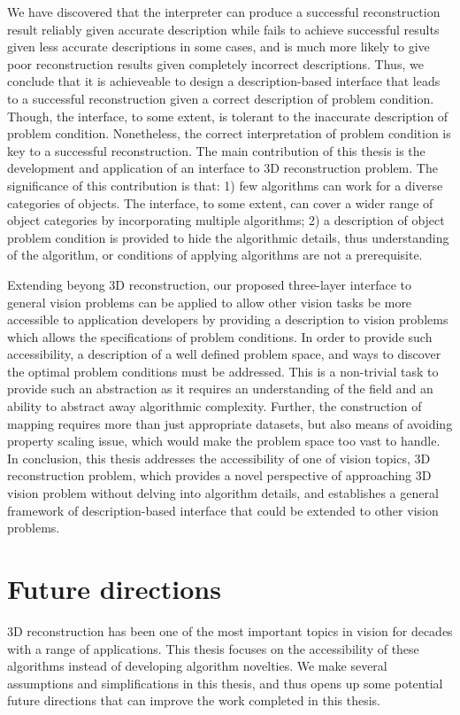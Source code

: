 We have discovered that the interpreter can produce a successful reconstruction result reliably given accurate description while fails to achieve successful results given less accurate descriptions in some cases, and is much more likely to give poor reconstruction results given completely incorrect descriptions. Thus, we conclude that it is achieveable to design a description-based interface that leads to a successful reconstruction given a correct description of problem condition. Though, the interface, to some extent, is tolerant to the inaccurate description of problem condition. Nonetheless, the correct interpretation of problem condition is key to a successful reconstruction. The main contribution of this thesis is the development and application of an interface to 3D reconstruction problem. The significance of this contribution is that: 1) few algorithms can work for a diverse categories of objects. The interface, to some extent, can cover a wider range of object categories by incorporating multiple algorithms; 2) a description of object problem condition is provided to hide the algorithmic details, thus understanding of the algorithm, or conditions of applying algorithms are not a prerequisite.

Extending beyong 3D reconstruction, our proposed three-layer interface to general vision problems can be applied to allow other vision tasks be more accessible to application developers by providing a description to vision problems which allows the specifications of problem conditions. In order to provide such accessibility, a description of a well defined problem space, and ways to discover the optimal problem conditions must be addressed. This is a non-trivial task to provide such an abstraction as it requires an understanding of the field and an ability to abstract away algorithmic complexity. Further, the construction of mapping requires more than just appropriate datasets, but also means of avoiding property scaling issue, which would make the problem space too vast to handle. In conclusion, this thesis addresses the accessibility of one of vision topics, 3D reconstruction problem, which provides a novel perspective of approaching 3D vision problem without delving into algorithm details, and establishes a general framework of description-based interface that could be extended to other vision problems.

\section{Future directions}
3D reconstruction has been one of the most important topics in vision for decades with a range of applications. This thesis focuses on the accessibility of these algorithms instead of developing algorithm novelties. We make several assumptions and simplifications in this thesis, and thus opens up some potential future directions that can improve the work completed in this thesis.

